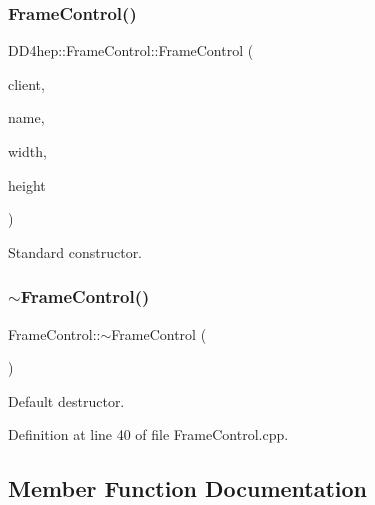 \subsubsection{\texorpdfstring{Frame\+Control()}{FrameControl()}}
{\footnotesize\ttfamily D\+D4hep\+::\+Frame\+Control\+::\+Frame\+Control (\begin{DoxyParamCaption}\item[{T\+G\+Client $\ast$}]{client,  }\item[{const std\+::string \&}]{name,  }\item[{unsigned int}]{width,  }\item[{unsigned int}]{height }\end{DoxyParamCaption})}



Standard constructor. 

\hypertarget{class_d_d4hep_1_1_frame_control_a84ff9b8462de97610195757d2cce4dd8}{}\label{class_d_d4hep_1_1_frame_control_a84ff9b8462de97610195757d2cce4dd8} 
\subsubsection{\texorpdfstring{$\sim$\+Frame\+Control()}{~FrameControl()}}
{\footnotesize\ttfamily Frame\+Control\+::$\sim$\+Frame\+Control (\begin{DoxyParamCaption}{ }\end{DoxyParamCaption})\hspace{0.3cm}{\ttfamily [virtual]}}



Default destructor. 



Definition at line 40 of file Frame\+Control.\+cpp.



\subsection{Member Function Documentation}
\hypertarget{class_d_d4hep_1_1_frame_control_a4ef181d24de565d17511bb9f5098184c}{}\label{class_d_d4hep_1_1_frame_control_a4ef181d24de565d17511bb9f5098184c} 
